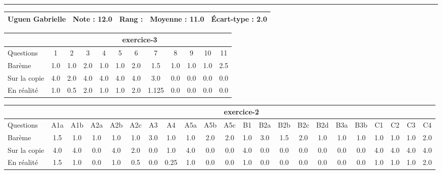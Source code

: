 \documentclass[a4paper, landscape, 10pt]{article}
\begin{document}
  \vspace{0.3cm}
  \hrule
  \vspace{0.3cm}

  \begin{minipage}{\textwidth}
    { \bf
    \begin{tabular}{|c|*{4}{c|}}
    \hline
      Uguen Gabrielle & Note : 12.0 & Rang :  & Moyenne : 11.0 & \'Ecart-type : 2.0 \\
    \hline
    \end{tabular}
    }
    
      \begin{tabular}{|l|*{ 11 }{c|}}
        \hline
        & \multicolumn{ 11 }{c|}{ exercice-3 } \\
        \hline
        Questions & 1&2&3&4&5&6&7&8&9&10&11 \\
        \hline
        Barème & 1.0&1.0&2.0&1.0&1.0&2.0&1.5&1.0&1.0&1.0&2.5 \\
        \hline
        Sur la copie & 4.0&2.0&4.0&4.0&4.0&4.0&3.0&0.0&0.0&0.0&0.0 \\
        \hline
        En réalité & 1.0&0.5&2.0&1.0&1.0&2.0&1.125&0.0&0.0&0.0&0.0 \\
        \hline
      \end{tabular}
    
      \begin{tabular}{|l|*{ 21 }{c|}}
        \hline
        & \multicolumn{ 21 }{c|}{ exercice-2 } \\
        \hline
        Questions & A1a&A1b&A2a&A2b&A2c&A3&A4&A5a&A5b&A5c&B1&B2a&B2b&B2c&B2d&B3a&B3b&C1&C2&C3&C4 \\
        \hline
        Barème & 1.5&1.0&1.0&1.0&1.0&3.0&1.0&1.0&2.0&2.0&1.0&3.0&1.5&2.0&1.0&1.0&1.0&1.0&1.0&1.0&2.0 \\
        \hline
        Sur la copie & 4.0&4.0&0.0&4.0&2.0&0.0&1.0&4.0&0.0&0.0&4.0&0.0&0.0&0.0&0.0&0.0&0.0&4.0&4.0&4.0&4.0 \\
        \hline
        En réalité & 1.5&1.0&0.0&1.0&0.5&0.0&0.25&1.0&0.0&0.0&1.0&0.0&0.0&0.0&0.0&0.0&0.0&1.0&1.0&1.0&2.0 \\
        \hline
      \end{tabular}
    

\end{minipage}
\end{document}
